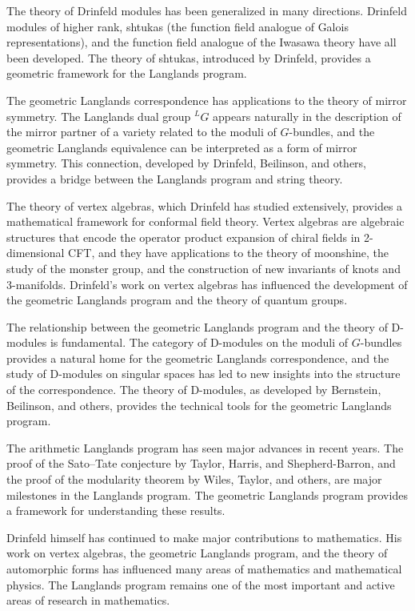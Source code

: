 The theory of Drinfeld modules has been generalized in many directions. Drinfeld modules of higher rank, shtukas (the function field analogue of Galois representations), and the function field analogue of the Iwasawa theory have all been developed. The theory of shtukas, introduced by Drinfeld, provides a geometric framework for the Langlands program.

The geometric Langlands correspondence has applications to the theory of mirror symmetry. The Langlands dual group ${}^LG$ appears naturally in the description of the mirror partner of a variety related to the moduli of $G$-bundles, and the geometric Langlands equivalence can be interpreted as a form of mirror symmetry. This connection, developed by Drinfeld, Beilinson, and others, provides a bridge between the Langlands program and string theory.

The theory of vertex algebras, which Drinfeld has studied extensively, provides a mathematical framework for conformal field theory. Vertex algebras are algebraic structures that encode the operator product expansion of chiral fields in 2-dimensional CFT, and they have applications to the theory of moonshine, the study of the monster group, and the construction of new invariants of knots and 3-manifolds. Drinfeld's work on vertex algebras has influenced the development of the geometric Langlands program and the theory of quantum groups.

The relationship between the geometric Langlands program and the theory of D-modules is fundamental. The category of D-modules on the moduli of $G$-bundles provides a natural home for the geometric Langlands correspondence, and the study of D-modules on singular spaces has led to new insights into the structure of the correspondence. The theory of D-modules, as developed by Bernstein, Beilinson, and others, provides the technical tools for the geometric Langlands program.

The arithmetic Langlands program has seen major advances in recent years. The proof of the Sato--Tate conjecture by Taylor, Harris, and Shepherd-Barron, and the proof of the modularity theorem by Wiles, Taylor, and others, are major milestones in the Langlands program. The geometric Langlands program provides a framework for understanding these results.

Drinfeld himself has continued to make major contributions to mathematics. His work on vertex algebras, the geometric Langlands program, and the theory of automorphic forms has influenced many areas of mathematics and mathematical physics. The Langlands program remains one of the most important and active areas of research in mathematics.

